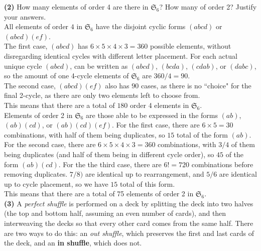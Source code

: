 \documentclass[12pt,letterpaper]{article}
\begin{document}
\textbf{(2)} How many elements of order 4 are there in \(\mathfrak{S}_{6}\)? How many of order 2? Justify your answers.\\

All elements of order \(4\) in \(\mathfrak{S}_{6}\) have the disjoint cyclic forms \((abcd)\) or \((abcd)(ef)\). \\

The first case, \((abcd)\) has \(6\times5\times4\times3 = 360\) possible elements, without disregarding identical cycles with different letter placement. For each actual unique cycle \((abcd)\), can be written as \((abcd)\), \((bcda)\), \((cdab)\), or \((dabc)\), so the amount of one 4-cycle elements of \(\mathfrak{S}_{6}\) are \(360/4 = 90.\) \\

The second case, \((abcd)(ef)\) also has \(90\) cases, as there is no ``choice" for the final 2-cycle, as there are only two elements left to choose from.\\

This means that there are a total of \(180\) order 4 elements in \(\mathfrak{S}_{6}\). \\
 
Elements of order 2 in \(\mathfrak{S}_{6}\) are those able to be expressed in the forms \((ab)\), \((ab)(cd)\), or \((ab)(cd)(ef)\). For the first case, there are \(6 \times 5 = 30\) combinations, with half of them being duplicates, so \(15\) total of the form \((ab)\). For the second case, there are \(6 \times 5\times 4 \times 3 = 360\) combinations, with \(3/4\) of them being duplicates (and half of them being in different cycle order), so \(45\) of the form \((ab)(cd)\). For the the third case, there are \(6! = 720\) combinations before removing duplicates. \(7/8)\) are identical up to rearrangement, and \(5/6\) are identical up to cycle placement, so we have \(15\) total of this form. \\

This means that there are a total of 75 elements of order 2 in \(\mathfrak{S}_{6}\). \\

\textbf{(3)} A \textit{perfect shuffle} is performed on a deck by splitting the deck into two halves (the top and bottom half, assuming an even number of cards), and then interweaving the decks so that every other card comes from the same half. There are two ways to do this: an \textit{out shuffle}, which preserves the first and last cards of the deck, and an \textbf{in shuffle}, which does not.\\
\end{document}
